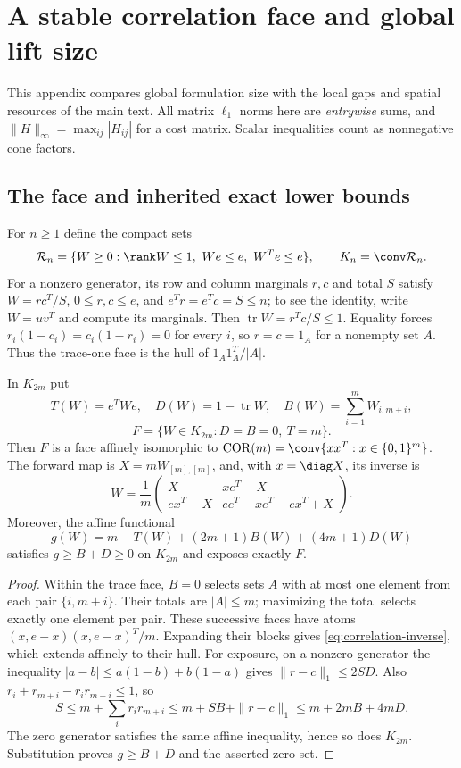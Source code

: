 \section{A stable correlation face and global lift size}\label{app:rank-one}
This appendix compares global formulation size with the local gaps and
spatial resources of the main text. All matrix $\ell_1$ norms here are
\emph{entrywise} sums, and $\|H\|_\infty=\max_{ij}|H_{ij}|$ for a cost
matrix. Scalar inequalities count as nonnegative cone factors.

\subsection{The face and inherited exact lower bounds}
For $n\ge1$ define the compact sets
\[
 \mathcal R_n=\{W\ge0:\rank W\le1,\ We\le e,\ W^Te\le e\},
 \qquad K_n=\conv\mathcal R_n.
\]
For a nonzero generator, its row and column marginals $r,c$ and total
$S$ satisfy $W=rc^T/S$, $0\le r,c\le e$, and $e^Tr=e^Tc=S\le n$; to see
the identity, write $W=uv^T$ and compute its marginals. Then $\operatorname{tr}W=r^Tc/S\le1$. Equality forces
$r_i(1-c_i)=c_i(1-r_i)=0$ for every $i$, so $r=c=1_A$ for a nonempty
set $A$. Thus the trace-one face is the hull of $1_A1_A^T/|A|$.

\begin{proposition}\label{prop:correlation-face}
In $K_{2m}$ put
\[
 T(W)=e^TWe,\quad D(W)=1-\operatorname{tr}W,\quad
 B(W)=\sum_{i=1}^m W_{i,m+i},
\]
\[
 F=\{W\in K_{2m}:D=B=0,\ T=m\}.
\]
Then $F$ is a face affinely isomorphic to
$\operatorname{COR}(m)=\conv\{xx^T:x\in\{0,1\}^m\}$.
The forward map is $X=mW_{[m],[m]}$, and, with $x=\diag X$, its inverse is
\begin{equation}\label{eq:correlation-inverse}
 W=\frac1m\begin{pmatrix}
 X&xe^T-X\\ ex^T-X&ee^T-xe^T-ex^T+X
 \end{pmatrix}.
\end{equation}
Moreover, the affine functional
\[
 g(W)=m-T(W)+(2m+1)B(W)+(4m+1)D(W)
\]
satisfies $g\ge B+D\ge0$ on $K_{2m}$ and exposes exactly $F$.
\end{proposition}
\begin{proof}
Within the trace face, $B=0$ selects sets $A$ with at most one element
from each pair $\{i,m+i\}$. Their totals are $|A|\le m$; maximizing the
total selects exactly one element per pair. These successive faces have
atoms $(x,e-x)(x,e-x)^T/m$. Expanding their blocks gives
\eqref{eq:correlation-inverse}, which extends affinely to their hull.
For exposure, on a nonzero generator the inequality
$|a-b|\le a(1-b)+b(1-a)$ gives $\|r-c\|_1\le2SD$.
Also $r_i+r_{m+i}-r_ir_{m+i}\le1$, so
\[
 S\le m+\sum_i r_ir_{m+i}\le m+SB+\|r-c\|_1
       \le m+2mB+4mD.
\]
The zero generator satisfies the same affine inequality, hence so does
$K_{2m}$. Substitution proves $g\ge B+D$ and the asserted zero set.
\end{proof}


